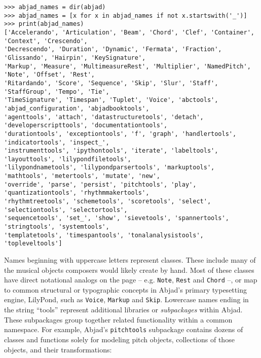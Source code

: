 \begin{abjadbookoutput}
\begin{singlespacing}
\vspace{-0.5\baselineskip}
\begin{verbatim}
>>> abjad_names = dir(abjad)
>>> abjad_names = [x for x in abjad_names if not x.startswith('_')]
>>> print(abjad_names)
['Accelerando', 'Articulation', 'Beam', 'Chord', 'Clef', 'Container', 'Context', 'Crescendo',
'Decrescendo', 'Duration', 'Dynamic', 'Fermata', 'Fraction', 'Glissando', 'Hairpin', 'KeySignature',
'Markup', 'Measure', 'MultimeasureRest', 'Multiplier', 'NamedPitch', 'Note', 'Offset', 'Rest',
'Ritardando', 'Score', 'Sequence', 'Skip', 'Slur', 'Staff', 'StaffGroup', 'Tempo', 'Tie',
'TimeSignature', 'Timespan', 'Tuplet', 'Voice', 'abctools', 'abjad_configuration', 'abjadbooktools',
'agenttools', 'attach', 'datastructuretools', 'detach', 'developerscripttools', 'documentationtools',
'durationtools', 'exceptiontools', 'f', 'graph', 'handlertools', 'indicatortools', 'inspect_',
'instrumenttools', 'ipythontools', 'iterate', 'labeltools', 'layouttools', 'lilypondfiletools',
'lilypondnametools', 'lilypondparsertools', 'markuptools', 'mathtools', 'metertools', 'mutate', 'new',
'override', 'parse', 'persist', 'pitchtools', 'play', 'quantizationtools', 'rhythmmakertools',
'rhythmtreetools', 'schemetools', 'scoretools', 'select', 'selectiontools', 'selectortools',
'sequencetools', 'set_', 'show', 'sievetools', 'spannertools', 'stringtools', 'systemtools',
'templatetools', 'timespantools', 'tonalanalysistools', 'topleveltools']
\end{verbatim}
\end{singlespacing}
\end{abjadbookoutput}

\noindent Names beginning with uppercase letters represent classes. These
include many of the musical objects composers would likely create by hand. Most
of these classes have direct notational analogs on the page -- e.g.
\texttt{Note}, \texttt{Rest} and \texttt{Chord} --, or map to common structural
or typographic concepts in Abjad's primary typesetting engine, LilyPond, such
as \texttt{Voice}, \texttt{Markup} and \texttt{Skip}. Lowercase names ending in
the string \enquote{tools} represent additional libraries or \emph{subpackages}
within Abjad. These subpackages group together related functionality within a
common namespace. For example, Abjad's \texttt{pitchtools} subpackage contains
dozens of classes and functions solely for modeling pitch objects, collections
of those objects, and their transformations:

